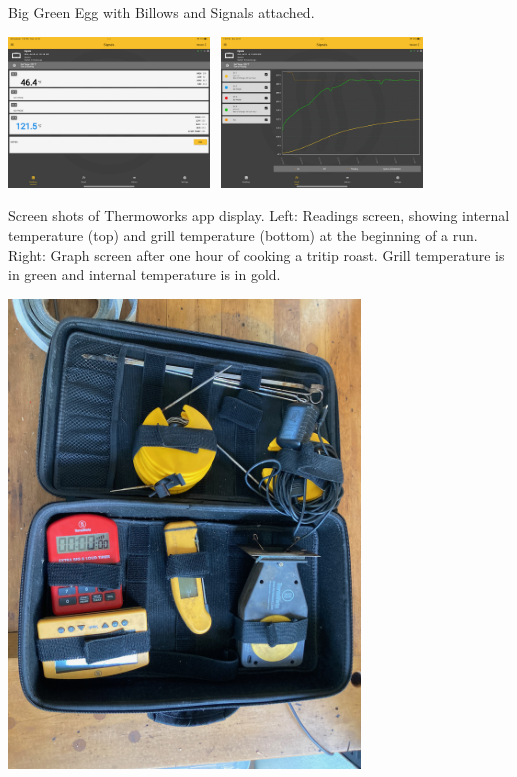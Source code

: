 \documentclass[
]{book}
\begin{document}
Big Green Egg with Billows and Signals attached.

\includegraphics[width=0.4\textwidth,height=\textheight]{images/ThermoScreen.jpeg}~ \includegraphics[width=0.4\textwidth,height=\textheight]{images/thermo1hour.jpeg}

Screen shots of Thermoworks app display. Left: Readings screen, showing internal temperature (top) and grill temperature (bottom) at the beginning of a run. Right: Graph screen after one hour of cooking a tritip roast. Grill temperature is in green and internal temperature is in gold.

\includegraphics[width=0.7\textwidth,height=\textheight]{images/thermokit.jpeg}
\end{document}
